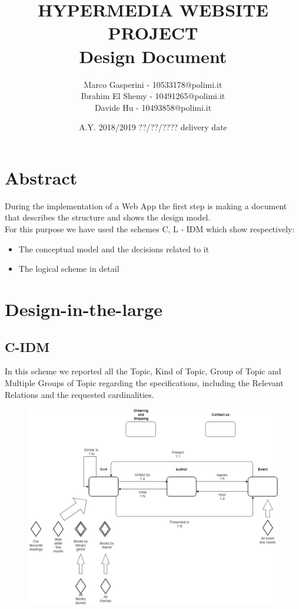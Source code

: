 \documentclass[12pt,a4paper]{article}
\title{\textbf{\Huge{HYPERMEDIA WEBSITE PROJECT}} \\ \large Design Document}
\author{Marco Gasperini - 10533178@polimi.it\\ Ibrahim El Shemy - 10491265@polimi.it \\ Davide Hu - 10493858@polimi.it}
\date{A.Y. 2018/2019 ??/??/???? delivery date}
\begin{document}
\maketitle
\newpage
\tableofcontents
\newpage

\section{Abstract}
During the implementation of a Web App the first step is making a document that describes the structure and shows the design model.\\For this purpose we have used the schemes C, L - IDM which show respectively:
\begin{itemize}
\item The conceptual model and the decisions related to it
\item The logical scheme in detail
\end{itemize}

\section{Design-in-the-large}
\subsection{C-IDM}
In this scheme we reported all the Topic, Kind of Topic, Group of Topic and Multiple Groups of Topic regarding the specifications, including the Relevant Relations and the requested cardinalities.
\begin{figure}[h]
\centering
\includegraphics[width=0.9\linewidth]{imm.jpg}
\label{fig:IDM}
\end{figure}
\end{document}
